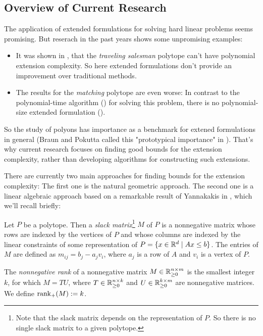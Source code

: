\subsection{Overview of Current Research}

The application of extended formulations for solving hard linear problems seems promising. But reserach in the past years shows some unpromising examples:
\begin{itemize}
  \item It was shown in \cite{fiorini2015exponential}, that the \emph{traveling salesman} polytope can't have polynomial extension complexity. So here extended formulations don't provide an improvement over traditional methods.
  \item The results for the \emph{matching} polytope are even worse: In contrast to the polynomial-time algorithm (\cite{ford1956maximal}) for solving this problem, there is no polynomial-size extended formulation (\cite{rothvoss2017matching}).
\end{itemize}

So the study of polyons has importance as a benchmark for extened formulations in general (Braun and Pokutta called this "prototypical importance" in \cite{braun2015matching}).
That's why current research focuses on finding good bounds for the extension complexity, rather than developing algorithms for constructing such extensions.

There are currently two main approaches for finding bounds for the extension complexity: The first one is the natural geometric approach. The second one is a linear algebraic approach based on a remarkable result of Yannakakis in \cite{yannakakis1991expressing}, which we'll recall briefly:

\begin{definition}
  Let $P$ be a polytope.
  Then a \emph{slack matrix}\footnote{Note that the slack matrix depends on the representation of $P$. So there is no single slack matrix to a given polytope.} $M$ of $P$ is a nonnegative matrix whose rows are indexed by the vertices of $P$ and whose columns are indexed by the linear constraints of some representation of $P=\{x \in \mathbb{R}^d \mid Ax \leq b\}$. 
  The entries of $M$ are defined as $m_{ij} = b_j - a_j v_i$, where $a_j$ is a row of $A$ and $v_i$ is a vertex of $P$.
\end{definition}

\begin{definition}
  The \emph{nonnegative rank} of a nonnegative matrix $M \in \mathbb{R}_{\geq 0}^{n \times m}$ is the smallest integer $k$, for which $M = TU$, where $T \in \mathbb{R}_{\geq 0}^{n \times k}$ and $U \in \mathbb{R}_{\geq 0}^{k \times m}$ are nonnegative matrices.
  We define $\operatorname{rank}_+(M) := k$.
\end{definition}

